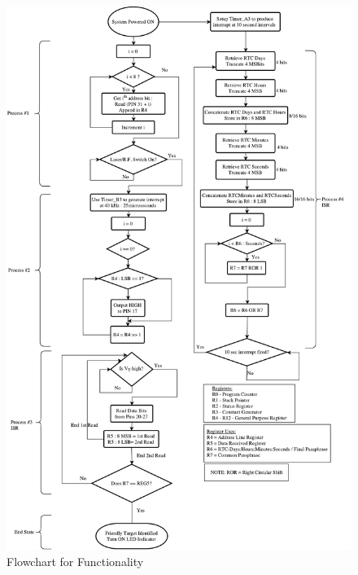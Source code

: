 \documentclass[letterpaper,10pt]{article}
\begin{document}
\begin{spacing}{1.15}
\begin{figure} [H]
	\centering
	\includegraphics[scale=0.50]{Friendly_Interrogator_Software_Flowchart.pdf}
	\caption{Flowchart for Functionality\label{fig:friendly-interrogator-software-flowchart}}
\end{figure}

\end{spacing}
\end{document}
